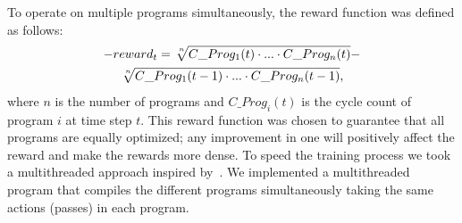 To operate on multiple programs simultaneously, the reward function was defined as follows:
\begin{multline}
     -reward_t = \sqrt[\leftroot{-2}\uproot{2}n]{C\_Prog_1(t) \cdot ... \cdot C\_Prog_n(t)} -
    \\
    \sqrt[\leftroot{-2}\uproot{2}n]{C\_Prog_1(t-1) \cdot ... \cdot C\_Prog_n(t-1)},
\end{multline}
where $n$ is the number of programs and $C\_Prog_i(t)$ is the cycle count of program $i$ at time step $t$. This reward function was chosen to guarantee that all programs are equally optimized; any improvement in one will positively affect the reward and make the rewards more dense. To speed the training process we took a multithreaded approach inspired by~\cite{mnih2016}. We implemented a multithreaded program that compiles the different programs simultaneously taking the same actions (passes) in each program.




